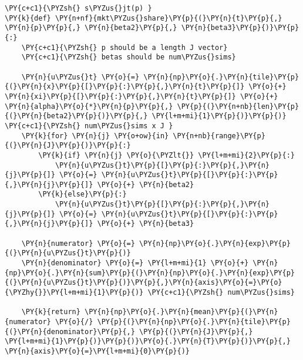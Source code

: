     \begin{tcolorbox}[breakable, size=fbox, boxrule=1pt, pad at break*=1mm,colback=cellbackground, colframe=cellborder]
\begin{Verbatim}[commandchars=\\\{\}]
\PY{c+c1}{\PYZsh{} s\PYZus{}jt(p) }
\PY{k}{def} \PY{n+nf}{mkt\PYZus{}share}\PY{p}{(}\PY{n}{t}\PY{p}{,} \PY{n}{p}\PY{p}{,} \PY{n}{beta2}\PY{p}{,} \PY{n}{beta3}\PY{p}{)}\PY{p}{:}
    \PY{c+c1}{\PYZsh{} p should be a length J vector}
    \PY{c+c1}{\PYZsh{} betas should be num\PYZus{}sims}

    \PY{n}{u\PYZus{}t} \PY{o}{=} \PY{n}{np}\PY{o}{.}\PY{n}{tile}\PY{p}{(}\PY{n}{x}\PY{p}{[}\PY{p}{:}\PY{p}{,}\PY{n}{t}\PY{p}{]} \PY{o}{+} \PY{n}{xi}\PY{p}{[}\PY{p}{:}\PY{p}{,}\PY{n}{t}\PY{p}{]} \PY{o}{+} \PY{n}{alpha}\PY{o}{*}\PY{n}{p}\PY{p}{,} \PY{p}{(}\PY{n+nb}{len}\PY{p}{(}\PY{n}{beta2}\PY{p}{)}\PY{p}{,} \PY{l+m+mi}{1}\PY{p}{)}\PY{p}{)} \PY{c+c1}{\PYZsh{} num\PYZus{}sims x J }
    \PY{k}{for} \PY{n}{j} \PY{o+ow}{in} \PY{n+nb}{range}\PY{p}{(}\PY{n}{J}\PY{p}{)}\PY{p}{:}
        \PY{k}{if} \PY{n}{j} \PY{o}{\PYZlt{}} \PY{l+m+mi}{2}\PY{p}{:}
            \PY{n}{u\PYZus{}t}\PY{p}{[}\PY{p}{:}\PY{p}{,}\PY{n}{j}\PY{p}{]} \PY{o}{=} \PY{n}{u\PYZus{}t}\PY{p}{[}\PY{p}{:}\PY{p}{,}\PY{n}{j}\PY{p}{]} \PY{o}{+} \PY{n}{beta2}
        \PY{k}{else}\PY{p}{:}
            \PY{n}{u\PYZus{}t}\PY{p}{[}\PY{p}{:}\PY{p}{,}\PY{n}{j}\PY{p}{]} \PY{o}{=} \PY{n}{u\PYZus{}t}\PY{p}{[}\PY{p}{:}\PY{p}{,}\PY{n}{j}\PY{p}{]} \PY{o}{+} \PY{n}{beta3}

    \PY{n}{numerator} \PY{o}{=} \PY{n}{np}\PY{o}{.}\PY{n}{exp}\PY{p}{(}\PY{n}{u\PYZus{}t}\PY{p}{)}
    \PY{n}{denominator} \PY{o}{=} \PY{l+m+mi}{1} \PY{o}{+} \PY{n}{np}\PY{o}{.}\PY{n}{sum}\PY{p}{(}\PY{n}{np}\PY{o}{.}\PY{n}{exp}\PY{p}{(}\PY{n}{u\PYZus{}t}\PY{p}{)}\PY{p}{,}\PY{n}{axis}\PY{o}{=}\PY{o}{\PYZhy{}}\PY{l+m+mi}{1}\PY{p}{)} \PY{c+c1}{\PYZsh{} num\PYZus{}sims}

    \PY{k}{return} \PY{n}{np}\PY{o}{.}\PY{n}{mean}\PY{p}{(}\PY{n}{numerator} \PY{o}{/} \PY{p}{(}\PY{n}{np}\PY{o}{.}\PY{n}{tile}\PY{p}{(}\PY{n}{denominator}\PY{p}{,} \PY{p}{(}\PY{n}{J}\PY{p}{,} \PY{l+m+mi}{1}\PY{p}{)}\PY{p}{)}\PY{o}{.}\PY{n}{T}\PY{p}{)}\PY{p}{,} \PY{n}{axis}\PY{o}{=}\PY{l+m+mi}{0}\PY{p}{)}
\end{Verbatim}
\end{tcolorbox}

